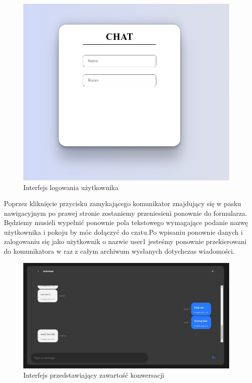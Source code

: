 \begin{figure}[htbp]
	\centering
	\includegraphics[width=0.5\linewidth]{"obrazy/TESTLOGOWANIE"}
	\caption{Interfejs logowania użytkownika}
	\label{fig:49}
\end{figure}
\newpage
Poprzez kliknięcie przycisku zamykającego komunikator znajdujący się w pasku nawigacyjnym po prawej stronie zostaniemy przeniesieni ponownie do formularza.  Będziemy musieli wypełnić ponownie pola tekstowego wymagające podanie nazwę użytkownika i pokoju by móc dołączyć do czatu.Po wpisaniu ponownie danych i zalogowaniu się jako użytkownik o nazwie user1 jesteśmy ponownie przekierowani do komunikatora w raz z całym archiwum wysłanych dotychczas wiadomości.
\begin{figure}[htbp]
	\centering
	\includegraphics[width=0.5\linewidth]{"obrazy/TESTostatniscreen"}
	\caption{Interfejs przedstawiający zawartość konwersacji}
	\label{fig:50}
\end{figure}
\newpage
